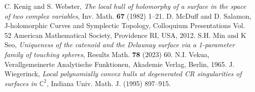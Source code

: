 \documentclass{amsart}
\begin{document}
\begin{thebibliography}{}
 C. Kenig and S. Webster, {\em The local hull of holomorphy of a surface in the space of two complex variables}, Inv. Math. \textbf{67} (1982) 1--21.
 D. McDuff and D. Salamon, { J-holomorphic Curves and Symplectic Topology}, Colloquium Presentations Vol. 52 American Mathematical Society, Providence RI, USA, 2012.
 S.H. Min and K Seo, {\it Uniqueness of the catenoid and the Delaunay surface via a 1-parameter family of touching spheres}, Results Math. \textbf{78} (2023) 60.
 N.I. Vekua, { Verallgemeinerte Analytische Funktionen}, Akademie Verlag, Berlin, 1965.
 J. Wiegerinck, {\it Local polynomially convex hulls at degenerated CR singularities of surfaces in ${\mathbb C}^2$},  Indiana Univ. Math. J. (1995) 897--915.
\end{thebibliography}
 
\end{document}
